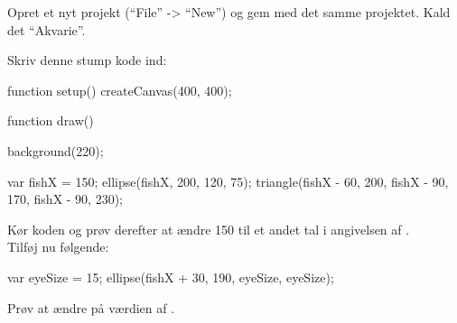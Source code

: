 \documentclass{ucph-handout}
\newcounter{handout}
\newcommand{\Ark}{Ark \#\arabic{handout} -- }
\begin{document}
\newpage
{}
\renewcommand{\Title}{\Ark Variable}%
\begin{exercisebox}[adjusted title=Tegn en simpel fisk]
Opret et nyt projekt (``File'' -> ``New'') og gem med det samme
projektet. Kald det ``Akvarie''.

\noindent
Skriv denne stump kode ind:
\begin{javascript}
function setup() {
  createCanvas(400, 400);
}

function draw() {
  background(220);
  
  var fishX = 150;
  ellipse(fishX, 200, 120, 75);
  triangle(fishX - 60, 200, fishX - 90, 170, fishX - 90, 230);
}

\end{javascript}
Kør koden og prøv derefter at ændre 150 til et andet tal i angivelsen af .\\

\noindent
Tilføj nu følgende:
\begin{javascript}
var eyeSize = 15;
ellipse(fishX + 30, 190, eyeSize, eyeSize);
\end{javascript}
Prøv at ændre på værdien af .
\end{exercisebox}
\end{document}
